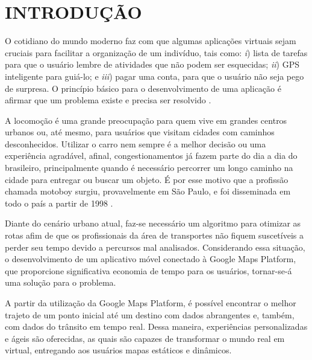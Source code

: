 
\chapter{INTRODUÇÃO}

O cotidiano do mundo moderno faz com que algumas aplicações virtuais sejam cruciais para facilitar a organização de um indivíduo, tais como: \textit{i}) lista de tarefas para que o usuário lembre de atividades que não podem ser esquecidas; \textit{ii}) GPS inteligente para guiá-lo; e \textit{iii}) pagar uma conta, para que o usuário não seja pego de surpresa. O princípio básico para o desenvolvimento de uma aplicação é afirmar que um problema existe e precisa ser resolvido \cite{desenvWebFrame}.

A locomoção é uma grande preocupação para quem vive em grandes centros urbanos ou, até mesmo, para usuários que visitam cidades com caminhos desconhecidos. Utilizar o carro nem sempre é a melhor decisão ou uma experiência agradável, afinal, congestionamentos já fazem parte do dia a dia do brasileiro, principalmente quando é necessário percorrer um longo caminho na cidade para entregar ou buscar um objeto. É por esse motivo que a profissão chamada motoboy surgiu, provavelmente em São Paulo, e foi disseminada em todo o país a partir de 1998 \cite{MotoboyVeja}.

Diante do cenário urbano atual, faz-se necessário um algoritmo para otimizar as rotas afim de que os profissionais da área de transportes não fiquem suscetíveis a perder seu tempo devido a percursos mal analisados. Considerando essa situação, o desenvolvimento de um aplicativo móvel conectado à Google Maps Platform, que proporcione significativa economia de tempo para os usuários, tornar-se-á uma solução para o problema.

A partir da utilização da Google Maps Platform, é possível encontrar o melhor trajeto de um ponto inicial até um destino com dados abrangentes e, também, com dados do trânsito em tempo real. Dessa maneira, experiências personalizadas e ágeis são oferecidas, as quais são capazes de transformar o mundo real em virtual, entregando aos usuários mapas estáticos e dinâmicos. 

